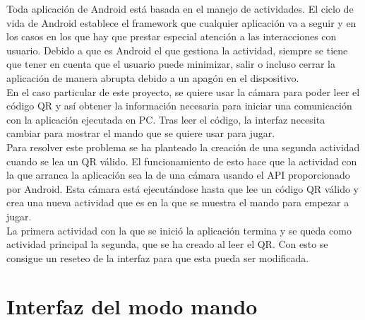 Toda aplicaci\'on de Android est\'a basada en el manejo de actividades. El ciclo de vida de Android establece el framework que cualquier aplicaci\'on va a seguir y en los casos en los que hay que prestar especial atenci\'on a las interacciones con usuario. Debido a que es Android el que gestiona la actividad, siempre se tiene que tener en cuenta que el usuario puede minimizar, salir o incluso cerrar la aplicaci\'on de manera abrupta debido a un apag\'on en el dispositivo.
\\
 En el caso particular de este proyecto, se quiere usar la c\'amara para poder leer el c\'odigo QR y as\'i obtener la informaci\'on necesaria para iniciar una comunicaci\'on con la aplicaci\'on ejecutada en PC. Tras leer el c\'odigo, la interfaz necesita cambiar para mostrar el mando que se quiere usar para jugar. 
\\
Para resolver este problema se ha planteado la creaci\'on de una segunda actividad cuando se lea un QR v\'alido. El funcionamiento de esto hace que la actividad con la que arranca la aplicaci\'on sea la de una c\'amara usando el API proporcionado por Android. Esta c\'amara est\'a ejecut\'andose hasta que lee un c\'odigo QR v\'alido y crea una nueva actividad que es en la que se muestra el mando para empezar a jugar.
\\
 La primera actividad con la que se inici\'o la aplicaci\'on termina y se queda como actividad principal la segunda, que se ha creado al leer el QR. Con esto se consigue un reseteo de la interfaz para que esta pueda ser modificada.


\section{Interfaz del modo mando}
\label{cap5:sec:rinterfaz}

